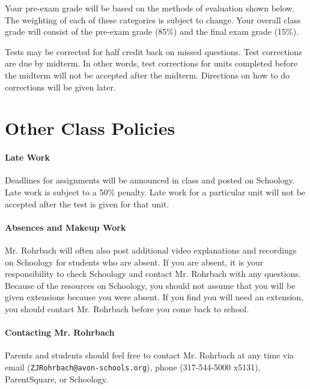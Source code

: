 \documentclass[10pt]{exam}
\begin{document}
Your pre-exam grade will be based on the methods of 
evaluation shown below. The weighting of each of these 
categories is subject to change. Your overall class 
grade will consist of the pre-exam grade (85\%) and the
final exam grade (15\%).

\begin{center}
\end{center}

Tests may be corrected for half credit back on missed 
questions.  Test corrections are due by midterm.  In other 
words, test corrections for units completed before the 
midterm will not be accepted after the midterm.  Directions 
on how to do corrections will be given later.



\section*{Other Class Policies}

\paragraph{Late Work}
	Deadlines for assignments will be announced in class and posted on Schoology.  Late work 
	is subject to a 50\% penalty.  Late work for a particular unit will not be accepted after
	the test is given for that unit.

\paragraph{Absences and Makeup Work}
	Mr. Rohrbach will often also post additional video explanations and recordings on Schoology for
	students who are absent.  If you are absent, it is your responsibility to check Schoology and
	contact Mr. Rohrbach with any questions.  Because of the resources on Schoology, you should not
	assume that you will be given extensions because you were absent. If you find you will need an
	extension, you should contact Mr. Rohrbach before you come back to school. 

\paragraph{Contacting Mr. Rohrbach}
	Parents and students should feel free to contact Mr. Rohrbach at any time via email 
	(\texttt{ZJRohrbach@avon-schools.org}), phone (317-544-5000 x5131), \mbox{ParentSquare}, 
	or Schoology.
\end{document}
